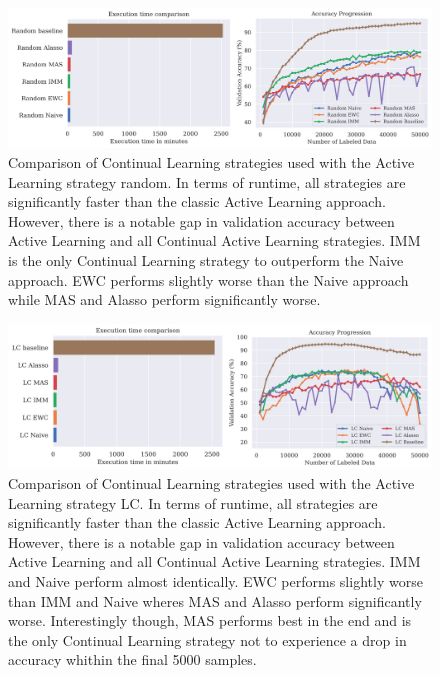 \begin{figure} [ht]
    \centering
    \includegraphics[width=\linewidth]{images/results_CAL/Random_CAL_1000b.png}
    \caption[Continual Active Learning Random 1000 batch size]{Comparison of Continual Learning strategies used with the Active Learning strategy random. In terms of runtime, all
     strategies are significantly faster than the classic Active Learning approach. However, there is a notable gap in validation accuracy between Active Learning and all Continual
     Active Learning strategies. IMM is the only Continual Learning strategy to outperform the Naive approach. EWC performs slightly worse than the Naive approach while MAS and Alasso
     perform significantly worse.}
    \label{fig:Evaluation:Results:CAL:Random1000}
\end{figure}

\begin{figure} [ht]
    \centering
    \includegraphics[width=\linewidth]{images/results_CAL/LC_CAL_1000b.png}
    \caption[Continual Active Learning Random 1000 batch size]{Comparison of Continual Learning strategies used with the Active Learning strategy LC. In terms of runtime, all
    strategies are significantly faster than the classic Active Learning approach. However, there is a notable gap in validation accuracy between Active Learning and all Continual
    Active Learning strategies. IMM and Naive perform almost identically. EWC performs slightly worse than IMM and Naive wheres MAS and Alasso perform significantly worse. Interestingly
    though, MAS performs best in the end and is the only Continual Learning strategy not to experience a  drop in accuracy whithin the final 5000 samples.}
    \label{fig:Evaluation:Results:CAL:LC1000}
\end{figure}

